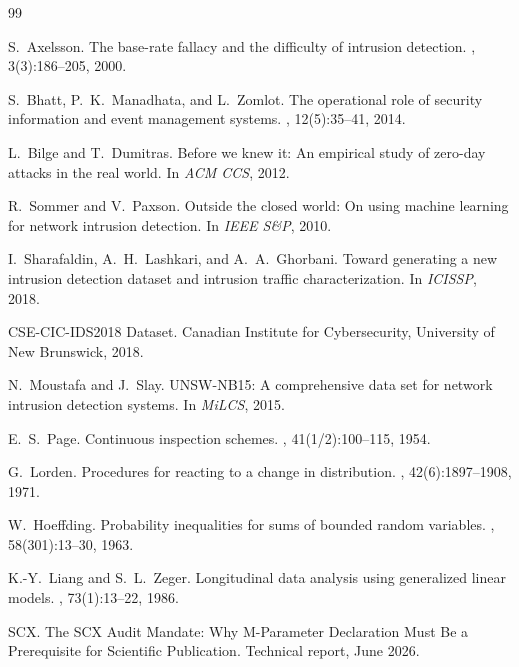 \documentclass[11pt,a4paper]{article}
\theoremstyle{definition}
\theoremstyle{remark}
\begin{document}
\begin{thebibliography}{99}

S.~Axelsson.
\newblock The base-rate fallacy and the difficulty of intrusion detection.
, 3(3):186--205, 2000.

S.~Bhatt, P.~K.~Manadhata, and L.~Zomlot.
\newblock The operational role of security information and event management systems.
, 12(5):35--41, 2014.

L.~Bilge and T.~Dumitras.
\newblock Before we knew it: An empirical study of zero-day attacks in the real world.
\newblock In {\em ACM CCS}, 2012.

R.~Sommer and V.~Paxson.
\newblock Outside the closed world: On using machine learning for network intrusion detection.
\newblock In {\em IEEE S\&P}, 2010.

I.~Sharafaldin, A.~H.~Lashkari, and A.~A.~Ghorbani.
\newblock Toward generating a new intrusion detection dataset and intrusion traffic characterization.
\newblock In {\em ICISSP}, 2018.

CSE-CIC-IDS2018 Dataset.
\newblock Canadian Institute for Cybersecurity, University of New Brunswick, 2018.

N.~Moustafa and J.~Slay.
\newblock UNSW-NB15: A comprehensive data set for network intrusion detection systems.
\newblock In {\em MiLCS}, 2015.

E.~S.~Page.
\newblock Continuous inspection schemes.
, 41(1/2):100--115, 1954.

G.~Lorden.
\newblock Procedures for reacting to a change in distribution.
, 42(6):1897--1908, 1971.

W.~Hoeffding.
\newblock Probability inequalities for sums of bounded random variables.
, 58(301):13--30, 1963.

K.-Y.~Liang and S.~L.~Zeger.
\newblock Longitudinal data analysis using generalized linear models.
, 73(1):13--22, 1986.

SCX.
\newblock The SCX Audit Mandate: Why M-Parameter Declaration Must Be a Prerequisite for Scientific Publication.
\newblock Technical report, June 2026.

\end{thebibliography}
\end{document}
